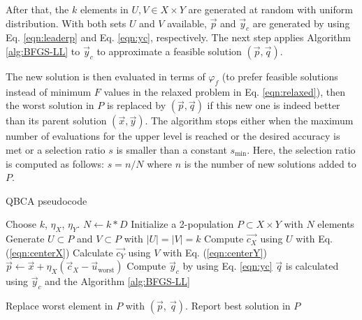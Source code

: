 \documentclass[conference]{IEEEtran}
\theoremstyle{definition}
\begin{document}
After that, the $k$ elements in $U, V \in X\times Y$ are generated at random with
uniform distribution. With both sets $U$ and $V$ available, $\vec{p}$ and $\vec{y}_c$
are generated by using Eq. \ref{eqn:leaderp} and Eq. \ref{eqn:yc}, respectively.
The next step applies Algorithm \ref{alg:BFGS-LL} to $\vec{y}_c$ to approximate
a feasible solution $(\vec{p}, \vec{q})$. 

The new solution is then evaluated in terms of $\varphi_f$ (to prefer feasible
solutions instead of minimum $F$ values in the relaxed problem in Eq. \ref{eqn:relaxed}),
then the worst solution in $P$ is replaced by $(\vec{p}, \vec{q})$ if this new
one is indeed better than its parent solution $(\vec{x}, \vec{y})$. The algorithm
stops either when the maximum number of evaluations for the upper level is reached
or the desired accuracy is met or a selection ratio $s$ is smaller than a constant
$s_{\min}$. Here, the selection ratio is computed as follows: $ s = n /N$ where
$n$ is the number of new solutions added to $P$.



\begin{algorithm}[!ht]
    \caption{QBCA pseudocode}
    \label{alg:QBCA}
    \begin{algorithmic}[1]
        \STATE Choose $k$, $\eta_{X}$, $\eta_{Y}$.
        \STATE $N \gets k * D$
        \STATE Initialize a 2-population $P\subset X\times Y$ with $N$ elements
                \STATE Generate $U \subset P$ and $V \subset P$ with $|U| = |V| = k$
                \STATE Compute $\vec{c_X}$ using $U$ with Eq. (\ref{eqn:centerX})
                \STATE Calculate $\vec{c_Y}$ using $V$ with Eq. (\ref{eqn:centerY})
                \STATE $ \vec{p} \gets \vec{x} + \eta_{X} (\vec{c}_X - \vec{u}_{\text{worst}})$
                \STATE Compute $ \vec{y}_c $ by using Eq. \ref{eqn:yc}
                \STATE $ \vec{q} $ is calculated using $\vec{y}_c$ and the Algorithm \ref{alg:BFGS-LL}
                
                    \STATE Replace worst element in $P$ with $(\vec{p},\ \vec{q})$.
                \ENDIF
            \ENDFOR
        \ENDWHILE
        \STATE Report best solution in $P$
    \end{algorithmic}
\end{algorithm}
\end{document}
